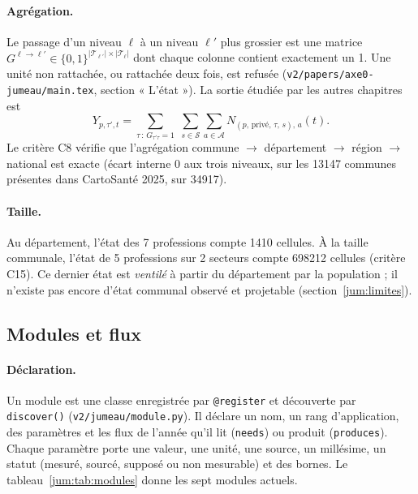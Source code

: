 \paragraph{Agrégation.} Le passage d'un niveau $\ell$ à un niveau $\ell'$ plus grossier est une matrice
$G^{\ell \to \ell'} \in \{0,1\}^{|\mathcal{T}_{\ell'}| \times |\mathcal{T}_\ell|}$ dont chaque colonne contient
exactement un 1. Une unité non rattachée, ou rattachée deux fois, est refusée (\texttt{v2/papers/axe0-jumeau/main.tex},
section « L'état »). La sortie étudiée par les autres chapitres est
\begin{equation}\label{jum:eq:sortie}
  Y_{p,\tau',t} = \sum_{\tau \,:\, G_{\tau'\tau} = 1} \;\sum_{s \in \mathcal{S}} \sum_{a \in \mathcal{A}}
  N_{(p,\,\text{privé},\,\tau,\,s),\,a}(t).
\end{equation}
Le critère C8 vérifie que l'agrégation commune $\to$ département $\to$ région $\to$ national est exacte (écart
interne $0$\mesure{} aux trois niveaux, sur les \num{13147}\mesure{} communes présentes dans CartoSanté 2025, sur \num{34917}).

\paragraph{Taille.} Au département, l'état des 7 professions compte \num{1410}\mesure{} cellules. À la taille
communale, l'état de 5 professions sur 2 secteurs compte \num{698212}\mesure{} cellules (critère C15). Ce
dernier état est \emph{ventilé} à partir du département par la population ; il n'existe pas encore d'état
communal observé et projetable (section~\ref{jum:limites}).

\subsection{Modules et flux}\label{jum:modules}

\paragraph{Déclaration.} Un module est une classe enregistrée par \texttt{@register} et découverte par
\texttt{discover()} (\texttt{v2/jumeau/module.py}). Il déclare un nom, un rang d'application, des paramètres et
les flux de l'année qu'il lit (\texttt{needs}) ou produit (\texttt{produces}). Chaque paramètre porte une valeur,
une unité, une source, un millésime, un statut (mesuré, sourcé, supposé ou non mesurable) et des bornes. Le
tableau~\ref{jum:tab:modules} donne les sept modules actuels.

